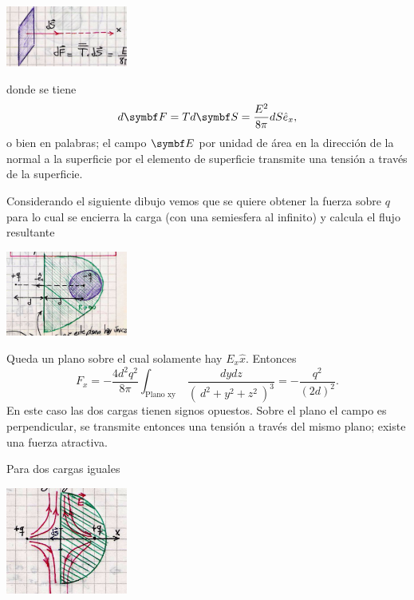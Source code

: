 \documentclass[10pt,oneside]{CBFT_book}
\begin{document}
\includegraphics[width=0.3\textwidth]{images/fig_ft1_tensorMax_B.jpg}

donde se tiene
\[
	d\vb{F} = T d\vb{S} = \frac{E^2}{8\pi} dS \hat{e}_x,
\]
o bien en palabras; el campo $\vb{E}$ por unidad de área en la dirección de la normal a la superficie
por el elemento de superficie transmite una tensión a través de la superficie.

\begin{ejemplo}{}

Considerando el siguiente dibujo vemos que se quiere obtener la fuerza sobre $q$ para lo cual se
encierra la carga (con una semiesfera al infinito) y calcula el flujo resultante

\includegraphics[width=0.3\textwidth]{images/fig_ft1_tensorMax_C.jpg}

Queda un plano sobre el cual solamente hay $E_x\hat{x}$.
Entonces
\[
	F_x = -\frac{4d^2q^2}{8\pi} \int_{\text{Plano xy}} \: \frac{dy dz}{( \: d^2 + y^2 + z^2 \: )^3} = 
	- \frac{q^2}{( 2 d )^2}.
\]
En este caso las dos cargas tienen signos opuestos. Sobre el plano el campo es perpendicular,
se transmite entonces una tensión a través del mismo plano; existe una fuerza atractiva.

Para dos cargas iguales

\includegraphics[width=0.3\textwidth]{images/fig_ft1_tensorMax_D.jpg}


\end{ejemplo}
\end{document}
